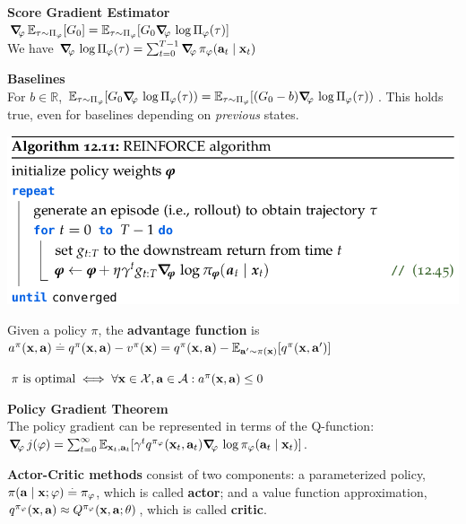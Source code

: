 \begin{framed}
    \textbf{Score Gradient Estimator} \\
    \(\grad_{\varphi}\mathbb{E}_{\tau\sim\Pi_{\varphi}}[G_0]=\mathbb{E}_{\tau\sim\Pi_{\varphi}}[G_0 \grad_{\varphi} \log \Pi_{\varphi}(\tau)]\)\\
    We have \(\grad_{\varphi} \log \Pi_{\varphi}(\tau)=\sum_{t=0}^{T-1}{\grad_{\varphi}\pi_{\varphi}(\va_t\mid \vx_t)}\)

\end{framed}
\begin{framed}
    \textbf{Baselines}\\ For \(b\in \mathbb{R}\), $\mathbb{E}_{\tau\sim\Pi_{\varphi}}[G_0 \grad_{\varphi} \log \Pi_{\varphi}(\tau))=\mathbb{E}_{\tau\sim\Pi_{\varphi}}[(G_0-b) \grad_{\varphi} \log \Pi_{\varphi}(\tau))$.
    This holds true, even for baselines depending on \textit{previous} states.
\end{framed}
\includegraphics[width=\linewidth]{images/REINFORCE.png}
\begin{framed}
    Given a policy $\pi$, the \textbf{advantage function} is $\a[\pi]{\vx}{\va} \defeq \q[\pi]{\vx}{\va} - \v[\pi]{\vx} = \q[\pi]{\vx}{\va} - \E[\vap \sim \pi(\vx)]{\q[\pi]{\vx}{\vap}}$
\end{framed}
$\text{$\pi$ is optimal} \iff \forall \vx \in \spX, \va \in \spA : \a[\pi]{\vx}{\va} \leq 0$
\begin{framed}
    \textbf{Policy Gradient Theorem}\\
    The policy gradient can be represented in terms of the Q-function: \(\grad_{\varphi}{j(\varphi)}=\sum_{t=0}^{\infty}{\mathbb{E}_{\vx_t,\va_t}[\gamma^t q^{\pi_\varphi}(\vx_t,\va_t)\grad_\varphi \log \pi_{\varphi}(\va_t\mid \vx_t)]}\).

    
\end{framed}
\begin{framed}
  \textbf{Actor-Critic methods} consist of two components: a parameterized policy, $\pi(\mathbf{a} \mid \mathbf{x}; \mathbf{\varphi}) \overset{.}{=} \pi_{\mathbf{\varphi}}$, which is called \textbf{actor}; and a value function approximation, $\q[\pi_\vvarphi]{\vx}{\va} \approx \Q[\pi_\vvarphi]{\vx}{\va; \vtheta}$, which is called \textbf{critic}.
\end{framed}
